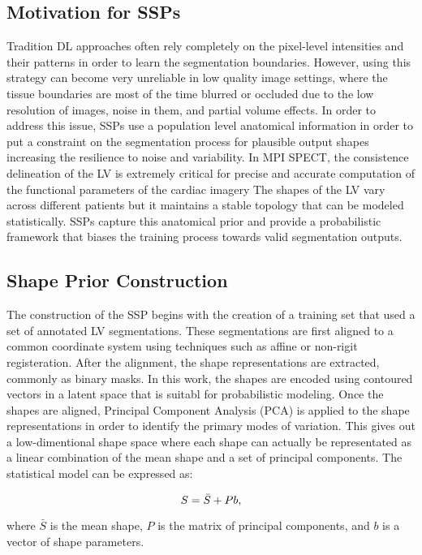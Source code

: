 \subsection{Motivation for SSPs}
Tradition DL approaches often rely completely on the pixel-level intensities and their patterns in order to learn the segmentation boundaries. However, using this strategy can become very unreliable in low quality image settings, where the tissue boundaries are most of the time blurred or occluded due to the low resolution of images, noise in them, and partial volume effects. In order to address this issue, SSPs use a population level anatomical information in order to put a constraint on the segmentation process for plausible output shapes increasing the resilience to noise and variability. In MPI SPECT, the consistence delineation of the LV is extremely critical for precise and accurate computation of the functional parameters of the cardiac imagery The shapes of the LV vary across different patients but it maintains a stable topology that can be modeled statistically. SSPs capture this anatomical prior and provide a probabilistic framework that biases the training process towards valid segmentation outputs.

\subsection{Shape Prior Construction}
The construction of the SSP begins with the creation of a training set that used a set of annotated LV segmentations. These segmentations are first aligned to a common coordinate system using techniques such as affine or non-rigit registeration. After the alignment, the shape representations are extracted, commonly as binary masks. In this work, the shapes are encoded using contoured vectors in a latent space that is suitabl for probabilistic modeling. Once the shapes are aligned, Principal Component Analysis (PCA) is applied to the shape representations in order to identify the primary modes of variation. This gives out a low-dimentional shape space where each shape can actually be representated as a linear combination of the mean shape and a set of principal components. The statistical model can be expressed as:

\begin{equation} 
\addcontentsline{equ}{equations}{\protect\numberline{\theequation}Statistical Shape Model}
    S = \bar{S} + Pb, 
\end{equation} 

where $\bar{S}$ is the mean shape, $P$ is the matrix of principal components, and $b$ is a vector of shape parameters.


